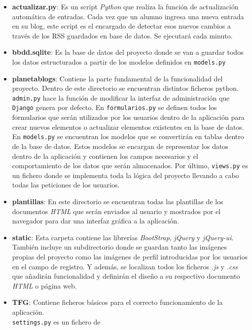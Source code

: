\documentclass[a4paper, 12pt]{book}
\begin{document}
\begin{itemize}
  \item {\bfseries actualizar.py}: Es un script \textit{Python} que realiza la funci\'on de actualizaci\'on autom\'atica de entradas. Cada vez que un alumno ingresa
  una nueva entrada en su blog, este script es el encargado de detectar esos nuevos cambios a trav\'es de los RSS guardados en base de datos. Se ejecutar\'a
  cada minuto.
  \item {\bfseries bbdd.sqlite}: Es la base de datos del proyecto donde se van a guardar todos los datos estructurados a partir de los modelos definidos en 
  \texttt{models.py}
  \item {\bfseries planetablogs}: Contiene la parte fundamental de la funcionalidad del proyecto. Dentro de este directorio se encuentran distintos ficheros
  python. \texttt{admin.py} hace la funci\'on de modificar la interfaz de administraci\'on que \texttt{Django} genera por defecto. En \texttt{formularios.py}
  se definen todos los formularios que ser\'an utilizados por los usuarios dentro de la aplicaci\'on para crear nuevos elementos o actualizar elementos
  existentes en la base de datos. En \texttt{models.py} se encuentran los modelos que se convertir\'an en tablas dentro de la base de datos. Estos modelos se
  encargan de representar los datos dentro de la aplicaci\'on y contienen los campos necesarios y el comportamiento de los datos que ser\'an almacenados.
  Por \'ultimo, \texttt{views.py} es un fichero donde se implementa toda la l\'ogica del proyecto llevando a cabo todas las peticiones de los usuarios.
  \item {\bfseries plantillas}: En este directorio se encuentran todas las plantillas de los documentos \textit{HTML} que ser\'an enviados al usuario y 
  mostrados por el navegador para dar una interfaz gr\'afica a la aplicaci\'on.
  \item {\bfseries static}: Esta carpeta contiene las librer\'ias \textit{BootStrap}, \textit{jQuery} y \textit{jQuery-ui}. Tambi\'en incluye un subdirectorio
  donde se guardan tanto las im\'agenes propias del proyecto como las im\'agenes de perfil introducidas por los usuarios en el campo de registro. 
  Y adem\'as, se localizan todos los ficheros \textit{.js} y \textit{.css} que a\~nadir\'an funcionalidad y definir\'an el dise\~no a su respectivo 
  documento \textit{HTML} o p\'agina web.
  \item {\bfseries TFG}: Contiene ficheros b\'asicos para el correcto funcionamiento de la aplicaci\'on.\\ \texttt{settings.py} es un fichero de 

\end{itemize}
\end{document}
